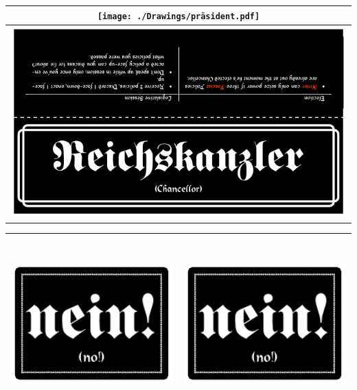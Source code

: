 \documentclass[12pt,a4paper,spanish]{article}
\begin{document}
	\newpage
	
	\begin{table}
		\centering
		\begin{tabular}{|c|}
			\toprule
			\texttt{[image: ./Drawings/präsident.pdf]} \\
			\midrule
			\includegraphics[width=19cm]{./Drawings/reichskanzler.pdf} \\
		\end{tabular}
		\begin{tabular}{|c|c|}
			\toprule
			\includegraphics[height=6.74cm]{./Drawings/nein!.pdf} &
			\includegraphics[height=6.74cm]{./Drawings/nein!.pdf} \\
			\bottomrule
		\end{tabular}
	\end{table}
\end{document}
